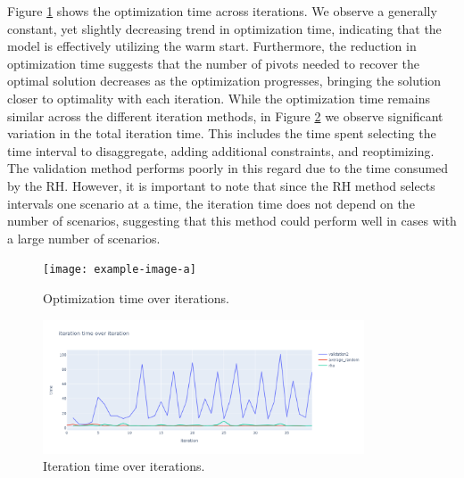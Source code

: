 \documentclass[smallextended,natbib]{svjour3}       %
\numberwithin{definition}{section}
\numberwithin{theorem}{section}
\numberwithin{proposition}{section}
\begin{document}
Figure \ref{fig:opt_time_over_iter} shows the optimization time across iterations.
 We observe a generally constant, yet slightly decreasing trend in optimization time, indicating that the model is effectively utilizing the warm start. Furthermore, the reduction in optimization time suggests that the number of pivots needed to recover the optimal solution decreases as the optimization progresses, bringing the solution closer to optimality with each iteration.
 While the optimization time remains similar across the different iteration methods, in Figure \ref{fig:iter_time_over_iter} we observe significant variation in the total iteration time. This includes the time spent selecting the time interval to disaggregate, adding additional constraints, and reoptimizing. 
 The validation method performs poorly in this regard due to the time consumed by the RH. However, it is important to note that since the RH method selects intervals one scenario at a time, the iteration time does not depend on the number of scenarios, suggesting that this method could perform well in cases with a large number of scenarios.
 

\begin{figure}[H]
  \centering
  \texttt{[image: example-image-a]}%
  \caption{Optimization time over iterations.}
  \label{fig:opt_time_over_iter}
\end{figure}

\begin{figure}[H]
  \centering
  \includegraphics[width=0.85\textwidth]{images/iter_time_over_iter.png}%
  \caption{Iteration time over iterations.}
  \label{fig:iter_time_over_iter}
\end{figure}






\end{document}
